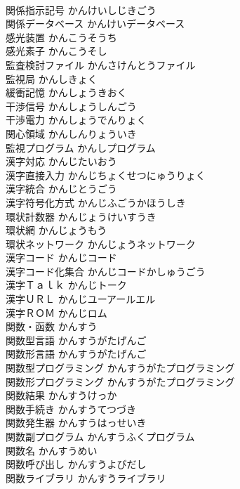 \documentclass[8pt]{extreport}
\begin{document}
\begin{CJK}{UTF8}{min}
\\	関係指示記号	かんけいしじきごう	
\\	関係データベース	かんけいデータベース	
\\	感光装置	かんこうそうち	
\\	感光素子	かんこうそし	
\\	監査検討ファイル	かんさけんとうファイル	
\\	監視局	かんしきょく	
\\	緩衝記憶	かんしょうきおく	
\\	干渉信号	かんしょうしんごう	
\\	干渉電力	かんしょうでんりょく	
\\	関心領域	かんしんりょういき	
\\	監視プログラム	かんしプログラム	
\\	漢字対応	かんじたいおう	
\\	漢字直接入力	かんじちょくせつにゅうりょく	
\\	漢字統合	かんじとうごう	
\\	漢字符号化方式	かんじふごうかほうしき	
\\	環状計数器	かんじょうけいすうき	
\\	環状網	かんじょうもう	
\\	環状ネットワーク	かんじょうネットワーク	
\\	漢字コード	かんじコード	
\\	漢字コード化集合	かんじコードかしゅうごう	
\\	漢字Ｔａｌｋ	かんじトーク	
\\	漢字ＵＲＬ	かんじユーアールエル	
\\	漢字ＲＯＭ	かんじロム	
\\	関数・函数	かんすう	
\\	関数型言語	かんすうがたげんご	
\\	関数形言語	かんすうがたげんご	
\\	関数型プログラミング	かんすうがたプログラミング	
\\	関数形プログラミング	かんすうがたプログラミング	
\\	関数結果	かんすうけっか	
\\	関数手続き	かんすうてつづき	
\\	関数発生器	かんすうはっせいき	
\\	関数副プログラム	かんすうふくプログラム	
\\	関数名	かんすうめい	
\\	関数呼び出し	かんすうよびだし	
\\	関数ライブラリ	かんすうライブラリ	

\end{CJK}
\end{document}
